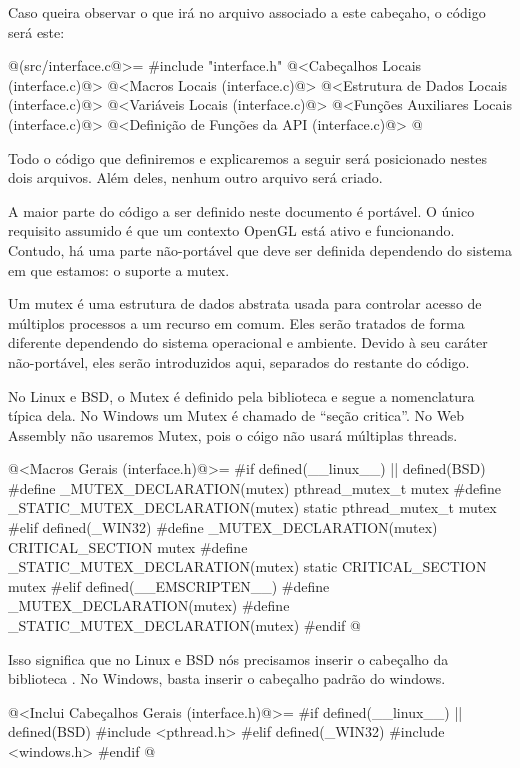 Caso queira observar o que irá no arquivo 
associado a este cabeçaho, o código será este:

\iniciocodigo
@(src/interface.c@>=
#include "interface.h"
@<Cabeçalhos Locais (interface.c)@>
@<Macros Locais (interface.c)@>
@<Estrutura de Dados Locais (interface.c)@>
@<Variáveis Locais (interface.c)@>
@<Funções Auxiliares Locais (interface.c)@>
@<Definição de Funções da API (interface.c)@>
@
\fimcodigo

Todo o código que definiremos e explicaremos a seguir será posicionado
nestes dois arquivos. Além deles, nenhum outro arquivo será criado.


A maior parte do código a ser definido neste documento é portável. O
único requisito assumido é que um contexto OpenGL está ativo e
funcionando. Contudo, há uma parte não-portável que deve ser definida
dependendo do sistema em que estamos: o suporte a mutex.

Um mutex é uma estrutura de dados abstrata usada para controlar acesso
de múltiplos processos a um recurso em comum. Eles serão tratados de
forma diferente dependendo do sistema operacional e ambiente. Devido à
seu caráter não-portável, eles serão introduzidos aqui, separados do
restante do código.

No Linux e BSD, o Mutex é definido pela biblioteca
 e segue a nomenclatura típica dela. No Windows um
Mutex é chamado de ``seção critica''. No Web Assembly não usaremos
Mutex, pois o cóigo não usará múltiplas threads.

\iniciocodigo
@<Macros Gerais (interface.h)@>=
#if defined(__linux__) || defined(BSD)
#define _MUTEX_DECLARATION(mutex) pthread_mutex_t mutex
#define _STATIC_MUTEX_DECLARATION(mutex) static pthread_mutex_t mutex
#elif defined(_WIN32)
#define _MUTEX_DECLARATION(mutex) CRITICAL_SECTION mutex
#define _STATIC_MUTEX_DECLARATION(mutex) static CRITICAL_SECTION mutex
#elif defined(__EMSCRIPTEN__)
#define _MUTEX_DECLARATION(mutex)
#define _STATIC_MUTEX_DECLARATION(mutex)
#endif
@
\fimcodigo

Isso significa que no Linux e BSD nós precisamos inserir o cabeçalho
da biblioteca . No Windows, basta inserir o
cabeçalho padrão do windows.

\iniciocodigo
@<Inclui Cabeçalhos Gerais (interface.h)@>=
#if defined(__linux__) || defined(BSD)
#include <pthread.h>
#elif defined(_WIN32)
#include <windows.h>
#endif
@
\fimcodigo

